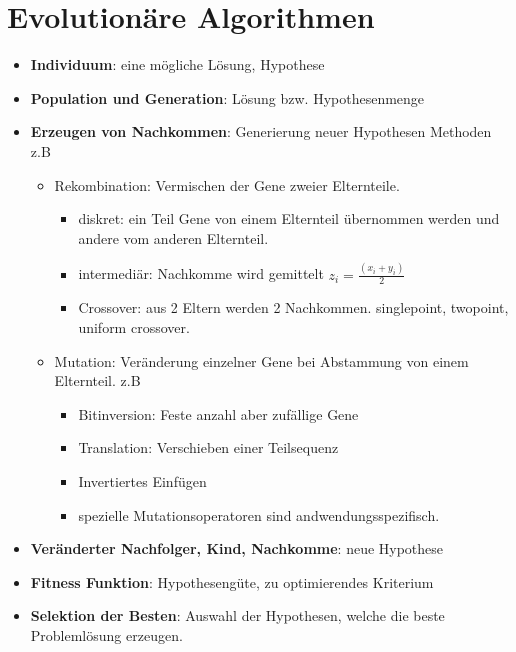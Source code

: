 \chapter{Evolutionäre Algorithmen}

\begin{itemize}
    \item \textbf{Individuum}: eine mögliche Lösung, Hypothese
    \item \textbf{Population und Generation}: Lösung bzw. Hypothesenmenge
    \item \textbf{Erzeugen von Nachkommen}: Generierung neuer Hypothesen
    Methoden z.B \begin{itemize}
        \item Rekombination: Vermischen der Gene zweier Elternteile.
        \begin{itemize}
            \item diskret: ein Teil Gene von einem Elternteil
            übernommen werden und andere vom anderen Elternteil.
            \item intermediär: Nachkomme wird gemittelt $z_i = \frac{(x_i + y_i)}{2}$
            \item Crossover: aus 2 Eltern werden 2 Nachkommen. singlepoint,
            twopoint, uniform crossover.
        \end{itemize}
        \item Mutation: Veränderung einzelner Gene bei Abstammung von einem Elternteil.
        z.B
        \begin{itemize}
            \item Bitinversion: Feste anzahl aber zufällige Gene
            \item Translation: Verschieben einer Teilsequenz
            \item Invertiertes Einfügen
            \item spezielle Mutationsoperatoren sind andwendungsspezifisch.
        \end{itemize}
    \end{itemize}
    \item \textbf{Veränderter Nachfolger, Kind, Nachkomme}: neue Hypothese
    \item \textbf{Fitness Funktion}: Hypothesengüte, zu optimierendes Kriterium
    \item \textbf{Selektion der Besten}: Auswahl der Hypothesen, welche die
    beste Problemlösung erzeugen.
\end{itemize}

